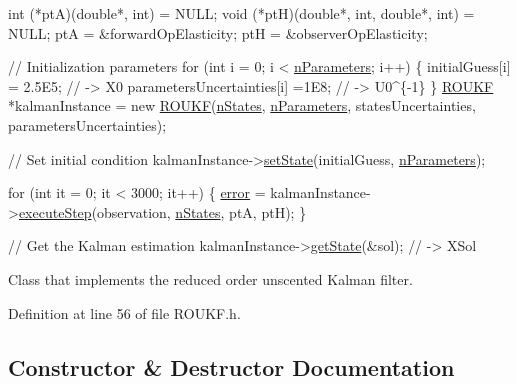 \begin{DoxyCode}
   int (*ptA)(\textcolor{keywordtype}{double}*, int) = NULL;
void (*ptH)(\textcolor{keywordtype}{double}*, int, \textcolor{keywordtype}{double}*, int) = NULL;
ptA = \&forwardOpElasticity;
ptH = \&observerOpElasticity;

 \textcolor{comment}{//    Initialization parameters}
\textcolor{keywordflow}{for} (\textcolor{keywordtype}{int} i = 0; i < \mbox{\hyperlink{classAbstractROUKF_a488f708dcdd66758cd879421cd454846}{nParameters}}; i++) \{
   initialGuess[i] = 2.5E5;            \textcolor{comment}{// -> X0}
   parametersUncertainties[i] =1E8;    \textcolor{comment}{// -> U0^\{-1\}}
\}
\mbox{\hyperlink{classROUKF}{ROUKF}} *kalmanInstance = \textcolor{keyword}{new} \mbox{\hyperlink{classROUKF_a16fd0fbe99e00745254f56052ad44f3f}{ROUKF}}(\mbox{\hyperlink{classAbstractROUKF_af9ce480feb5d97761f20fdd546878aff}{nStates}}, \mbox{\hyperlink{classAbstractROUKF_a488f708dcdd66758cd879421cd454846}{nParameters}}, statesUncertainties,
parametersUncertainties);

\textcolor{comment}{// Set initial condition}
kalmanInstance->\mbox{\hyperlink{classAbstractROUKF_a618f4719892c0997e5f62cc23913aa12}{setState}}(initialGuess, \mbox{\hyperlink{classAbstractROUKF_a488f708dcdd66758cd879421cd454846}{nParameters}});

\textcolor{keywordflow}{for} (\textcolor{keywordtype}{int} it = 0; it < 3000; it++) \{
   \mbox{\hyperlink{classAbstractROUKF_a551d0b61b010efe7923358c93cbd0db5}{error}} = kalmanInstance->\mbox{\hyperlink{classROUKF_ad200c0176a1e6e443fbea55bd8905dd6}{executeStep}}(observation, \mbox{\hyperlink{classAbstractROUKF_af9ce480feb5d97761f20fdd546878aff}{nStates}}, ptA, ptH);
\}

\textcolor{comment}{// Get the Kalman estimation}
kalmanInstance->\mbox{\hyperlink{classAbstractROUKF_ad24dafa1f4cb02a38958264740588b87}{getState}}(\&sol);            \textcolor{comment}{// -> XSol}
\end{DoxyCode}
 Class that implements the reduced order unscented Kalman filter. 

Definition at line 56 of file R\+O\+U\+K\+F.\+h.



\subsection{Constructor \& Destructor Documentation}
\mbox{\label{classROUKF_a16fd0fbe99e00745254f56052ad44f3f}} 
